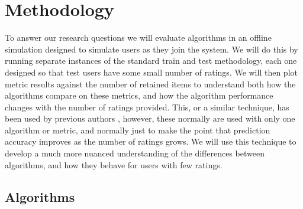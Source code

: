 \documentclass[letterpaper]{sig-alternate}
\begin{document}
  






\section{Methodology}
\label{sec:methodology}

  To answer our research questions we will evaluate algorithms in an offline simulation designed to simulate users as they join the system.
  We will do this by running separate instances of the standard train and test methodology, each one designed so that test users have some small number of ratings.
  We will then plot metric results against the number of retained items to understand both how the algorithms compare on these metrics, and how the algorithm performance changes with the number of ratings provided.
  This, or a similar technique, has been used by previous authors \cite{DrennerInitialExperiance, TenIsEnough, AdaptiveBootstrap}, however, these normally are used with only one algorithm or metric, and normally just to make the point that prediction accuracy improves as the number of ratings grows.
  We will use this technique to develop a much more nuanced understanding of the differences between algorithms, and how they behave for users with few ratings.

  \subsection*{Algorithms}
\end{document}
